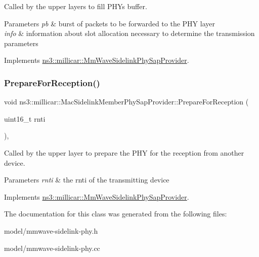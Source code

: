 Called by the upper layers to fill P\+HY\textquotesingle{}s buffer. 


\begin{DoxyParams}{Parameters}
{\em pb} & burst of packets to be forwarded to the P\+HY layer \\
\hline
{\em info} & information about slot allocation necessary to determine the transmission parameters \\
\hline
\end{DoxyParams}


Implements \hyperlink{classns3_1_1millicar_1_1MmWaveSidelinkPhySapProvider_acba80cb123b9eb0fcacefde35a91909d}{ns3\+::millicar\+::\+Mm\+Wave\+Sidelink\+Phy\+Sap\+Provider}.

\mbox{\label{classns3_1_1millicar_1_1MacSidelinkMemberPhySapProvider_afe0a87706052aabc88e7c4fbd4cc7a02}} 
\subsubsection{\texorpdfstring{Prepare\+For\+Reception()}{PrepareForReception()}}
{\footnotesize\ttfamily void ns3\+::millicar\+::\+Mac\+Sidelink\+Member\+Phy\+Sap\+Provider\+::\+Prepare\+For\+Reception (\begin{DoxyParamCaption}\item[{uint16\+\_\+t}]{rnti }\end{DoxyParamCaption})\hspace{0.3cm}{\ttfamily [override]}, {\ttfamily [virtual]}}



Called by the upper layer to prepare the P\+HY for the reception from another device. 


\begin{DoxyParams}{Parameters}
{\em rnti} & the rnti of the transmitting device \\
\hline
\end{DoxyParams}


Implements \hyperlink{classns3_1_1millicar_1_1MmWaveSidelinkPhySapProvider_a1c791fea7b4457a39428f3da49eaf6b8}{ns3\+::millicar\+::\+Mm\+Wave\+Sidelink\+Phy\+Sap\+Provider}.



The documentation for this class was generated from the following files\+:\begin{DoxyCompactItemize}
\item 
model/mmwave-\/sidelink-\/phy.\+h\item 
model/mmwave-\/sidelink-\/phy.\+cc\end{DoxyCompactItemize}
